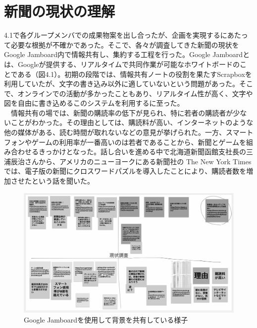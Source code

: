 \section{新聞の現状の理解}
4.1で各グループメンバでの成果物案を出し合ったが、企画を実現するにあたって必要な根拠が不確かであった。そこで、各々が調査してきた新聞の現状をGoogle Jamboard内で情報共有し、集約する工程を行った。Google Jamboardとは、Googleが提供する、リアルタイムで共同作業が可能なホワイトボードのことである（図4.1）。初期の段階では、情報共有ノートの役割を果たすScrapboxを利用していたが、文字の書き込み以外に適していないという問題があった。そこで、オンラインでの活動が多かったこともあり、リアルタイム性が高く、文字や図を自由に書き込めるこのシステムを利用するに至った。\\
　情報共有の場では、新聞の購読率の低下が見られ、特に若者の購読者が少ないことがわかった。その理由としては、購読料が高い、インターネットのような他の媒体がある、読む時間が取れないなどの意見が挙げられた。一方、スマートフォンやゲームの利用率が一番高いのは若者であることから、新聞とゲームを組み合わせるきっかけとなった。話し合いを進める中で北海道新聞函館支社長の三浦辰治さんから、アメリカのニューヨークにある新聞社の The New York Times では、電子版の新聞にクロスワードパズルを導入したことにより、購読者数を増加させたという話を聞いた。
\newpage
\begin{figure}[htbp]
    \centering
    \includegraphics[width=12cm]{images/Project_Research.png}
    \caption{Google Jamboardを使用して背景を共有している様子}
\end{figure}

